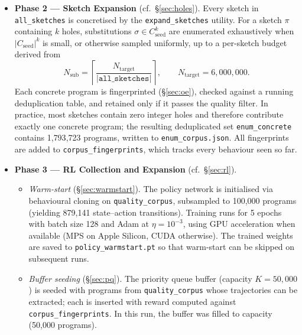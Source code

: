 \documentclass[11pt,a4paper]{article}
\begin{document}
\begin{itemize}
  \item \textbf{Phase 2 --- Sketch Expansion}
    (cf.~\S\ref{sec:holes}).
    Every sketch in \texttt{all\_sketches} is concretised by the
    \texttt{expand\_sketches} utility.  For a sketch $\pi$ containing $k$
    holes, substitutions $\sigma \in C_{\mathrm{seed}}^k$ are enumerated
    exhaustively when $|C_{\mathrm{seed}}|^k$ is small, or otherwise sampled
    uniformly, up to a per-sketch budget derived from
    \[
      N_{\mathrm{sub}} = \left\lceil \frac{N_{\mathrm{target}}}{|\texttt{all\_sketches}|} \right\rceil,
      \qquad N_{\mathrm{target}} = 6{,}000{,}000.
    \]
    Each concrete program is fingerprinted (\S\ref{sec:oe}), checked against a
    running deduplication table, and retained only if it passes the quality
    filter.  In practice, most sketches contain zero integer holes and therefore
    contribute exactly one concrete program; the resulting deduplicated set
    \texttt{enum\_concrete} contains 1{,}793{,}723 programs, written to
    \texttt{enum\_corpus.json}.  All fingerprints are added to
    \texttt{corpus\_fingerprints}, which tracks every behaviour seen so far.

  \item \textbf{Phase 3 --- RL Collection and Expansion}
    (cf.~\S\ref{sec:rl}).
    \begin{itemize}
      \item \emph{Warm-start} (\S\ref{sec:warmstart}).  The policy
            network is initialised via behavioural cloning on
            \texttt{quality\_corpus}, subsampled to 100{,}000 programs
            (yielding 879{,}141 state--action transitions).  Training runs for
            5 epochs with batch size 128 and Adam at $\eta = 10^{-3}$, using
            GPU acceleration when available (MPS on Apple Silicon, CUDA
            otherwise).  The trained weights are saved to
            \texttt{policy\_warmstart.pt} so that warm-start can be skipped on
            subsequent runs.

      \item \emph{Buffer seeding} (\S\ref{sec:pq}).  The
            priority queue buffer (capacity $K = 50{,}000$) is seeded with
            programs from \texttt{quality\_corpus} whose trajectories can be
            extracted; each is inserted with reward computed against
            \texttt{corpus\_fingerprints}.  In this run, the buffer was filled
            to capacity (50{,}000 programs).


\end{itemize}
\end{itemize}
\end{document}
